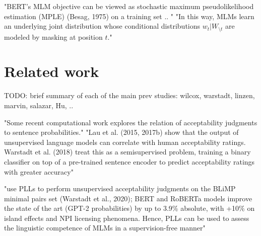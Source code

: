 

"BERT’s MLM objective can be viewed as stochastic maximum pseudolikelihood estimation (MPLE) \citet{wang2019bert}(Besag, 1975) on a training set  .. " \citep{salazar2020masked}
"In this way, MLMs learn an underlying joint distribution whose conditional distributions 
$w_t | W_{\setminus t}$ 
are modeled by masking at position $t$."  \citep{salazar2020masked}






\chapter{Related work}

TODO: brief summary of each of the main prev studies:
wilcox, warstadt, linzen, marvin, salazar, Hu, ..

"Some recent computational work explores the relation of acceptability judgments to sentence probabilities." \citep{lau2020furiously} 
"Lau et al. (2015, 2017b) show that the output of unsupervised language models can correlate with human acceptability ratings. Warstadt et al. (2018) treat this as a semisupervised problem, training a binary classifier on top of a pre-trained sentence encoder to predict acceptability ratings with greater accuracy"\citep{lau2020furiously} 

\citet{salazar2020masked}  "use PLLs to perform unsupervised acceptability judgments on the BLiMP minimal pairs set (Warstadt et al., 2020); BERT and RoBERTa models improve the state of the art (GPT-2 probabilities)
by up to 3.9\% absolute, with +10\% on island effects and NPI licensing phenomena. Hence, PLLs can be used to assess the linguistic competence of
MLMs in a supervision-free manner"


